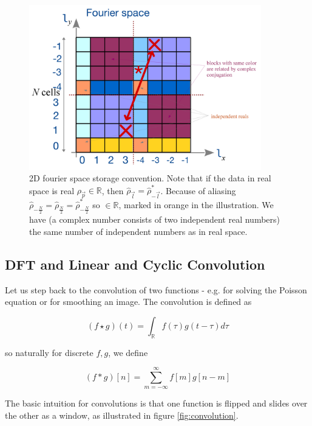 \begin{figure}[ht]
    \centering
    \includegraphics[width=0.9\textwidth]{figures/dftstorage2D.png}
    \caption{2D fourier space storage convention. Note that if the data in real space
    is real $\rho_{\vec{p}} \in \mathbb{R}$, then $\hat{\rho}_{\vec{l}} = \hat{\rho}_{-\vec{l}}^*$.
    Because of aliasing $\hat{\rho}_{-\frac{N}{2}} = \hat{\rho}_{\frac{N}{2}} = \hat{\rho}_{-\frac{N}{2}}^*$ so $\in \mathbb{R}$,
    marked in orange in the illustration. We have (a complex number consists of two independent real numbers) the same number of independent numbers as in real space.}
    \label{fig:dftstorage2D}
\end{figure}

\subsection{DFT and Linear and Cyclic Convolution}
Let us step back to the convolution of two functions - 
e.g. for solving the Poisson equation or for smoothing
an image. The convolution is defined as

\begin{equation}
    (f \star g)(t) = \int_{\mathbb{R}} f(\tau) g(t-\tau) d \tau
\end{equation}

so naturally for discrete $f,g$, we define

\begin{equation}
    (f * g)[n]=\sum_{m=-\infty}^{\infty} f[m] g[n-m]
\end{equation}

The basic intuition for convolutions is that one function is flipped and slides over the other
as a window, as illustrated in figure \ref{fig:convolution}.


